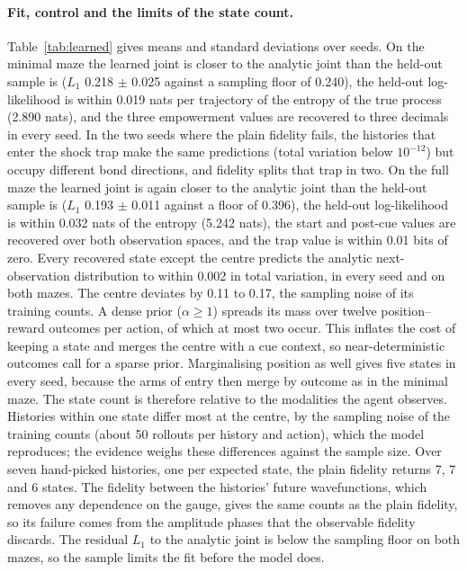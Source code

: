 \documentclass[letterpaper]{article} %
\theoremstyle{definition}
\begin{document}
\paragraph{Fit, control and the limits of the state count.} Table~\ref{tab:learned} gives means and standard deviations over seeds. On the minimal maze the learned joint is closer to the analytic joint than the held-out sample is ($L_1$ 0.218 $\pm$ 0.025 against a sampling floor of 0.240), the held-out log-likelihood is within 0.019 nats per trajectory of the entropy of the true process (2.890 nats), and the three empowerment values are recovered to three decimals in every seed. In the two seeds where the plain fidelity fails, the histories that enter the shock trap make the same predictions (total variation below $10^{-12}$) but occupy different bond directions, and fidelity splits that trap in two. On the full maze the learned joint is again closer to the analytic joint than the held-out sample is ($L_1$ 0.193 $\pm$ 0.011 against a floor of 0.396), the held-out log-likelihood is within 0.032 nats of the entropy (5.242 nats), the start and post-cue values are recovered over both observation spaces, and the trap value is within 0.01 bits of zero. Every recovered state except the centre predicts the analytic next-observation distribution to within 0.002 in total variation, in every seed and on both mazes. The centre deviates by 0.11 to 0.17, the sampling noise of its training counts. A dense prior ($\alpha \ge 1$) spreads its mass over twelve position--reward outcomes per action, of which at most two occur. This inflates the cost of keeping a state and merges the centre with a cue context, so near-deterministic outcomes call for a sparse prior. Marginalising position as well gives five states in every seed, because the arms of entry then merge by outcome as in the minimal maze. The state count is therefore relative to the modalities the agent observes. Histories within one state differ most at the centre, by the sampling noise of the training counts (about 50 rollouts per history and action), which the model reproduces; the evidence weighs these differences against the sample size. Over seven hand-picked histories, one per expected state, the plain fidelity returns 7, 7 and 6 states. The fidelity between the histories' future wavefunctions, which removes any dependence on the gauge, gives the same counts as the plain fidelity, so its failure comes from the amplitude phases that the observable fidelity discards. The residual $L_1$ to the analytic joint is below the sampling floor on both mazes, so the sample limits the fit before the model does.
\end{document}
